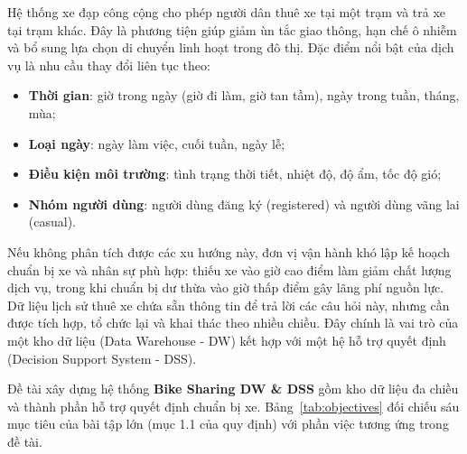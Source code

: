 
Hệ thống xe đạp công cộng cho phép người dân thuê xe tại một trạm và trả xe tại trạm khác. Đây là phương tiện giúp giảm ùn tắc giao thông, hạn chế ô nhiễm và bổ sung lựa chọn di chuyển linh hoạt trong đô thị. Đặc điểm nổi bật của dịch vụ là nhu cầu thay đổi liên tục theo:
\begin{itemize}
    \item \textbf{Thời gian}: giờ trong ngày (giờ đi làm, giờ tan tầm), ngày trong tuần, tháng, mùa;
    \item \textbf{Loại ngày}: ngày làm việc, cuối tuần, ngày lễ;
    \item \textbf{Điều kiện môi trường}: tình trạng thời tiết, nhiệt độ, độ ẩm, tốc độ gió;
    \item \textbf{Nhóm người dùng}: người dùng đăng ký (registered) và người dùng vãng lai (casual).
\end{itemize}
Nếu không phân tích được các xu hướng này, đơn vị vận hành khó lập kế hoạch chuẩn bị xe và nhân sự phù hợp: thiếu xe vào giờ cao điểm làm giảm chất lượng dịch vụ, trong khi chuẩn bị dư thừa vào giờ thấp điểm gây lãng phí nguồn lực. Dữ liệu lịch sử thuê xe chứa sẵn thông tin để trả lời các câu hỏi này, nhưng cần được tích hợp, tổ chức lại và khai thác theo nhiều chiều. Đây chính là vai trò của một kho dữ liệu (Data Warehouse - DW) kết hợp với một hệ hỗ trợ quyết định (Decision Support System - DSS).

Đề tài xây dựng hệ thống \textbf{Bike Sharing DW \& DSS} gồm kho dữ liệu đa chiều và thành phần hỗ trợ quyết định chuẩn bị xe. Bảng~\ref{tab:objectives} đối chiếu sáu mục tiêu của bài tập lớn (mục 1.1 của quy định) với phần việc tương ứng trong đề tài.

